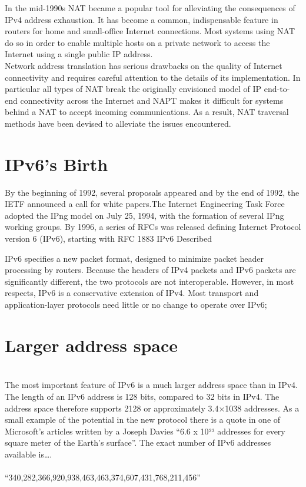 \documentclass[12pt]{article}
\begin{document}
In the mid-1990s NAT became a popular tool for alleviating the consequences of IPv4 address exhaustion. It has become a common, indispensable feature in routers for home and small-office Internet connections. Most systems using NAT do so in order to enable multiple hosts on a private network to access the Internet using a single public IP address.\\

Network address translation has serious drawbacks on the quality of Internet connectivity and requires careful attention to the details of its implementation. In particular all types of NAT break the originally envisioned model of IP end-to-end connectivity across the Internet and NAPT makes it difficult for systems behind a NAT to accept incoming communications. As a result, NAT traversal methods have been devised to alleviate the issues encountered.\\
\section{IPv6's Birth}
By the beginning of 1992, several proposals appeared and by the end of 1992, the IETF announced a call for white papers.The Internet Engineering Task Force adopted the IPng model on July 25, 1994, with the formation of several IPng working groups. By 1996, a series of RFCs was released defining Internet Protocol version 6 (IPv6), starting with RFC 1883
IPv6 Described

IPv6 specifies a new packet format, designed to minimize packet header processing by routers. Because the headers of IPv4 packets and IPv6 packets are significantly different, the two protocols are not interoperable. However, in most respects, IPv6 is a conservative extension of IPv4. Most transport and application-layer protocols need little or no change to operate over IPv6;\\

\section{Larger address space}\\

The most important feature of IPv6 is a much larger address space than in IPv4. The length of an IPv6 address is 128 bits, compared to 32 bits in IPv4. The address space therefore supports 2128 or approximately 3.4×1038 addresses. As a small example of the potential in the new protocol there is a quote in one of Microsoft’s articles written by a Joseph Davies “6.6 x 10²³ addresses for every square meter of the Earth’s surface”. The exact number of IPv6 addresses available is….\\\\
\indent “340,282,366,920,938,463,463,374,607,431,768,211,456”\\
\end{document}

